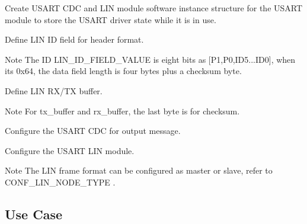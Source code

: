 \begin{DoxyEnumerate}
\item Create U\+S\+A\+RT C\+DC and L\+IN module software instance structure for the U\+S\+A\+RT module to store the U\+S\+A\+RT driver state while it is in use. 
\begin{DoxyCodeInclude}{0}
\end{DoxyCodeInclude}

\item Define L\+IN ID field for header format. 
\begin{DoxyCodeInclude}{0}
\end{DoxyCodeInclude}
 \begin{DoxyNote}{Note}
The ID {\ttfamily L\+I\+N\+\_\+\+I\+D\+\_\+\+F\+I\+E\+L\+D\+\_\+\+V\+A\+L\+UE} is eight bits as \mbox{[}P1,P0,I\+D5...I\+D0\mbox{]}, when it\textquotesingle{}s 0x64, the data field length is four bytes plus a checksum byte.
\end{DoxyNote}

\item Define L\+IN R\+X/\+TX buffer. 
\begin{DoxyCodeInclude}{0}
\end{DoxyCodeInclude}
 \begin{DoxyNote}{Note}
For {\ttfamily tx\+\_\+buffer} and {\ttfamily rx\+\_\+buffer}, the last byte is for checksum.
\end{DoxyNote}

\item Configure the U\+S\+A\+RT C\+DC for output message. 
\begin{DoxyCodeInclude}{0}
\end{DoxyCodeInclude}

\item Configure the U\+S\+A\+RT L\+IN module. 
\begin{DoxyCodeInclude}{0}
\end{DoxyCodeInclude}
 \begin{DoxyNote}{Note}
The L\+IN frame format can be configured as master or slave, refer to {\ttfamily C\+O\+N\+F\+\_\+\+L\+I\+N\+\_\+\+N\+O\+D\+E\+\_\+\+T\+Y\+PE} .
\end{DoxyNote}

\end{DoxyEnumerate}\hypertarget{asfdoc_sam0_sercom_usart_lin_use_case_asfdoc_sam0_usart_lin_use_case_main}{}\subsection{Use Case}\label{asfdoc_sam0_sercom_usart_lin_use_case_asfdoc_sam0_usart_lin_use_case_main}
